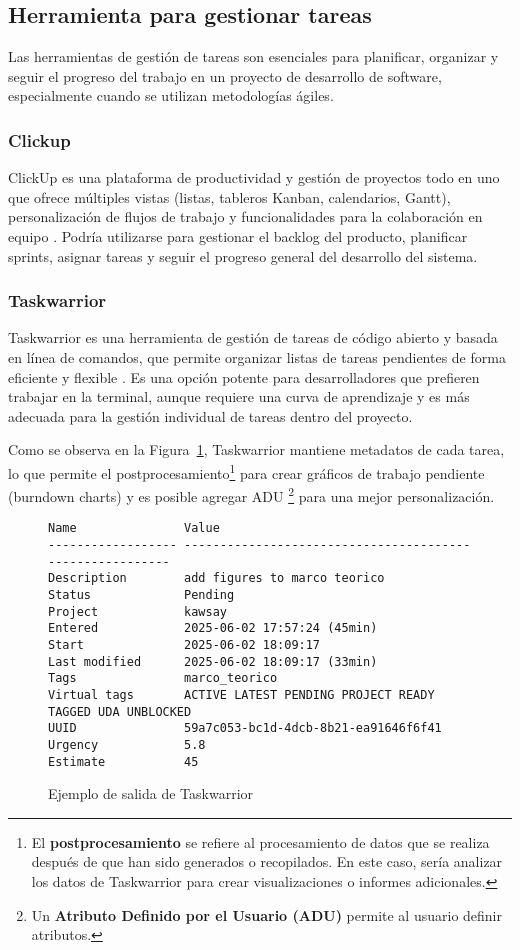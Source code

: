 \subsection{Herramienta para gestionar tareas}
Las herramientas de gestión de tareas son esenciales para planificar, organizar y seguir el progreso del trabajo en un proyecto de desarrollo de software, especialmente cuando se utilizan metodologías ágiles.

\subsubsection{Clickup}
ClickUp es una plataforma de productividad y gestión de proyectos todo en uno que ofrece múltiples vistas (listas, tableros Kanban, calendarios, Gantt), personalización de flujos de trabajo y funcionalidades para la colaboración en equipo \parencite{ClickUp}.
Podría utilizarse para gestionar el backlog del producto, planificar sprints, asignar tareas y seguir el progreso general del desarrollo del sistema.

\subsubsection{Taskwarrior}
Taskwarrior es una herramienta de gestión de tareas de código abierto y basada en línea de comandos, que permite organizar listas de tareas pendientes de forma eficiente y flexible \parencite{Taskwarrior}.
Es una opción potente para desarrolladores que prefieren trabajar en la terminal, aunque requiere una curva de aprendizaje y es más adecuada para la gestión individual de tareas dentro del proyecto.

Como se observa en la Figura~\ref{fig:taskWarriorTaskOutput}, Taskwarrior mantiene metadatos de cada tarea, lo que permite el postprocesamiento\footnote{El \textbf{postprocesamiento} se refiere al procesamiento de datos que se realiza después de que han sido generados o recopilados.
En este caso, sería analizar los datos de Taskwarrior para crear visualizaciones o informes adicionales.} para crear gráficos de trabajo pendiente (burndown charts) y es posible agregar ADU \footnote{Un \textbf{Atributo Definido por el Usuario (ADU)} permite al usuario definir atributos.} para una mejor personalización.

\begin{figure}
	\caption{Ejemplo de salida de Taskwarrior}\label{fig:taskWarriorTaskOutput}
	\begin{verbatim}
Name               Value
------------------ ---------------------------------------------------------
Description        add figures to marco teorico
Status             Pending
Project            kawsay
Entered            2025-06-02 17:57:24 (45min)
Start              2025-06-02 18:09:17
Last modified      2025-06-02 18:09:17 (33min)
Tags               marco_teorico
Virtual tags       ACTIVE LATEST PENDING PROJECT READY TAGGED UDA UNBLOCKED
UUID               59a7c053-bc1d-4dcb-8b21-ea91646f6f41
Urgency            5.8
Estimate           45
	\end{verbatim}
\end{figure}

